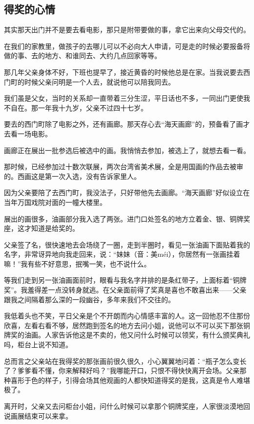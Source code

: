 \subsection{得奖的心情}


\par 其实那天出门并不是要去看电影，那只是附带要做的事，拿它出来向父母交代的。
\par 在我们的家教里，做孩子的去哪儿可以不必向大人申请，可是走的时候必要报备将做的事、去的地方、和谁同去、大约几点回家等等。
\par 那几年父亲身体不好，下班也提早了，接近黄昏的时候他总是在家。当我说要去西门町的时候父亲问明是一个人去，就说他可以陪我同去。
\par 我们虽是父女，当时的关系却一直带着三分生涩，平日话也不多，一同出门更使我不自在。那一年我十九岁，父亲不过四十七岁。
\par 要去的西门町除了电影之外，还有画廊。那天存心去“海天画廊”的，预备看了画才去看一场电影。
\par 画廊正在展出一批参选后被选中的画。我悄悄去参加，被选上了，就想去看一看。
\par 那时候，已经参加过十数次联展，两次台湾省美术展，全是用国画的作品去被审的。西画这是第一次入选，没有告诉家里人。
\par 因为父亲要陪了去西门町，我没法子，只好带他先去画廊。“海天画廊”好似设立在当年万国戏院对面的一幢大楼里。
\par 展出的画很多，油画部分我入选了两张。进门口处签名的地方立着金、银、铜牌奖座，这才知道是给奖的。
\par 父亲签了名，很快速地去会场绕了一圈，走到半圈时，看见一张油画下面贴着我的名字，非常讶异地向我走回来，说：“妹妹（音：美méi），你居然有一张画挂着嘛！”我有些不好意思，抿嘴一笑，也不说什么。
\par 等我们走到另一张油画面前时，眼看与我名字并排的是条红带子，上面标着“铜牌奖”。我羞得差一点没转身就逃。在父亲面前得了奖真是喜也不敢喜出来——父亲跟我之间隔着那么深的一段幽谷，多年来我们不交往的。
\par 我低着头也不笑，平日父亲是个不开朗而内心情感丰富的人。这一回他忍不住那份欣喜，左看右看不够，居然跑到签名的地方去问小姐，说他可以不可以买下那张铜牌奖的油画。人家告诉他这是不卖的，他又问什么时候可以领奖，有什么颁奖典礼吗，柜台上说不知道。
\par 总而言之父亲站在我得奖的那张画前很久很久，小心翼翼地问着：“瓶子怎么变长了？爹爹看不懂，你来解释好吗？”我哪能开口，只恨不得快快离开会场。父亲那种喜形于色的样子，引得会场其他观画的人都快知道得奖的是我，这真是令人难堪极了。
\par 离开时，父亲又去问柜台小姐，问什么时候可以拿那个铜牌奖座，人家很淡漠地回说画展结束可以来拿。
